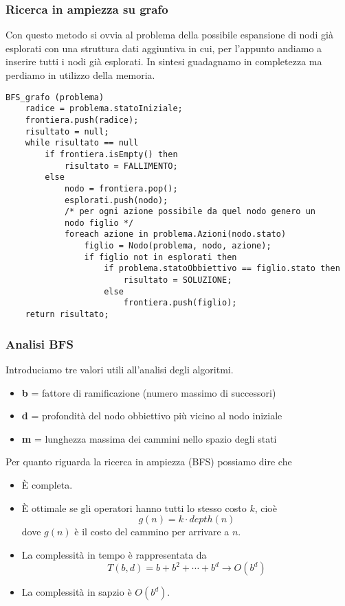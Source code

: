 \subsubsection{Ricerca in ampiezza su grafo}
Con questo metodo si ovvia al problema della possibile espansione di nodi gi\`a esplorati
con una struttura dati aggiuntiva in cui, per l'appunto andiamo a inserire tutti i nodi
gi\`a esplorati. In sintesi guadagnamo in completezza ma perdiamo in utilizzo della memoria.
\begin{lstlisting}[style=pseudo-style]
BFS_grafo (problema)
	radice = problema.statoIniziale;
	frontiera.push(radice);
	risultato = null;
	while risultato == null
		if frontiera.isEmpty() then
			risultato = FALLIMENTO;
		else
			nodo = frontiera.pop();
			esplorati.push(nodo);
			/* per ogni azione possibile da quel nodo genero un 
			nodo figlio */
			foreach azione in problema.Azioni(nodo.stato)
				figlio = Nodo(problema, nodo, azione);
				if figlio not in esplorati then
					if problema.statoObbiettivo == figlio.stato then
						risultato = SOLUZIONE;
					else
						frontiera.push(figlio);
	return risultato;
\end{lstlisting}

\subsubsection{Analisi BFS}
Introduciamo tre valori utili all'analisi degli algoritmi.
\begin{itemize}
	\item \textbf b = fattore di ramificazione (numero massimo di successori)
	\item \textbf d = profondit\`a del nodo obbiettivo pi\`u vicino al nodo iniziale
	\item \textbf m = lunghezza massima dei cammini nello spazio degli stati
\end{itemize}
Per quanto riguarda la ricerca in ampiezza (BFS) possiamo dire che
\begin{itemize}
	\item \`E completa.
	\item \`E ottimale se gli operatori hanno tutti lo stesso costo $k$, cio\`e
	      \[ g(n) = k \cdot depth(n) \]
	      dove $g(n)$ \`e il costo del cammino per arrivare a $n$.
	\item La complessit\`a in tempo \`e rappresentata da
	      \[ T(b, d) = b + b^2 + \cdots + b^d \rightarrow O(b^d) \]
	\item La complessit\`a in sapzio \`e $O(b^d)$.
\end{itemize}

